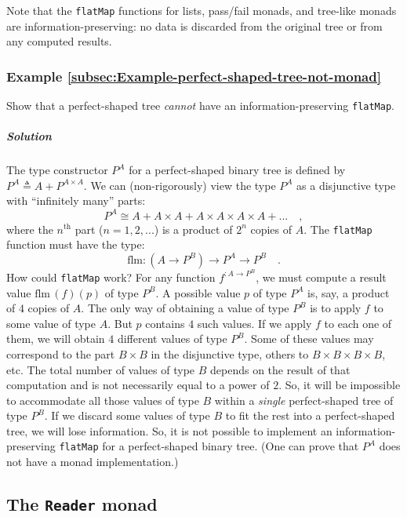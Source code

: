Note that the \lstinline!flatMap! functions for lists, pass/fail
monads, and tree-like monads are information-preserving: no data is
discarded from the original tree or from any computed results.

\subsubsection{Example \label{subsec:Example-perfect-shaped-tree-not-monad}\ref{subsec:Example-perfect-shaped-tree-not-monad}}

Show that a perfect-shaped tree \emph{cannot} have an information-preserving
\lstinline!flatMap!.

\subparagraph{Solution}

The type constructor $P^{A}$ for a perfect-shaped binary tree is
defined by $P^{A}\triangleq A+P^{A\times A}$. We can (non-rigorously)
view the type $P^{A}$ as a disjunctive type with \textsf{``}infinitely many\textsf{''}
parts:
\[
P^{A}\cong A+A\times A+A\times A\times A\times A+...\quad,
\]
where the $n^{\text{th}}$ part ($n=1,2,...$) is a product of $2^{n}$
copies of $A$. The \lstinline!flatMap! function must have the type:
\[
\text{flm}:(A\rightarrow P^{B})\rightarrow P^{A}\rightarrow P^{B}\quad.
\]
How could \lstinline!flatMap! work? For any function $f^{:A\rightarrow P^{B}}$,
we must compute a result value $\text{flm}\,(f)(p)$ of type $P^{B}$.
A possible value $p$ of type $P^{A}$ is, say, a product of $4$
copies of $A$. The only way of obtaining a value of type $P^{B}$
is to apply $f$ to some value of type $A$. But $p$ contains $4$
such values. If we apply $f$ to each one of them, we will obtain
$4$ different values of type $P^{B}$. Some of these values may correspond
to the part $B\times B$ in the disjunctive type, others to $B\times B\times B\times B$,
etc. The total number of values of type $B$ depends on the result
of that computation and is not necessarily equal to a power of $2$.
So, it will be impossible to accommodate all those values of type
$B$ within a \emph{single} perfect-shaped tree of type $P^{B}$.
If we discard some values of type $B$ to fit the rest into a perfect-shaped
tree, we will lose information. So, it is not possible to implement
an information-preserving \lstinline!flatMap! for a perfect-shaped
binary tree. (One can prove that $P^{A}$ does not have a monad implementation.)

\subsection{The \texttt{Reader} monad\label{subsec:The-Reader-monad}}

